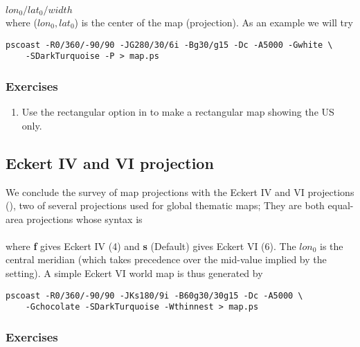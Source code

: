 \documentclass{report}
\begin{document}
$lon_0/lat_0/width$ \\

\noindent
where ($lon_0, lat_0$) is the center of the map (projection).
As an example we will try

{\small\begin{verbatim}
pscoast -R0/360/-90/90 -JG280/30/6i -Bg30/g15 -Dc -A5000 -Gwhite \
    -SDarkTurquoise -P > map.ps
\end{verbatim}
}

\subsubsection{Exercises}

\begin{enumerate}

\item Use the rectangular option in  to make a rectangular map
showing the US only.

\end{enumerate}

\subsection{Eckert IV and VI projection}

We conclude the survey of map projections with the Eckert IV and VI projections
(\Opt{JK}), two of several projections used for global thematic maps; They
are both equal-area projections whose syntax is \\

 \\

\noindent
where \textbf{f} gives Eckert IV (4) and \textbf{s} (Default) gives Eckert VI (6).
The $lon_0$ is the central meridian (which takes precedence over
the mid-value implied by the \Opt{R} setting).  A simple Eckert VI world map
is thus generated by

{\small\begin{verbatim}
pscoast -R0/360/-90/90 -JKs180/9i -B60g30/30g15 -Dc -A5000 \
    -Gchocolate -SDarkTurquoise -Wthinnest > map.ps
\end{verbatim}
}

\subsubsection{Exercises}
\end{document}
